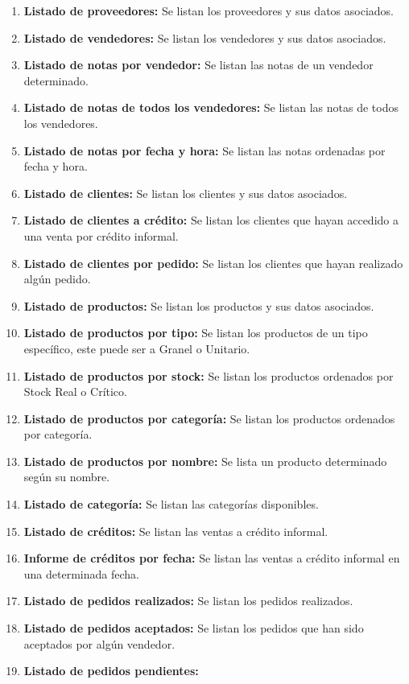 \documentclass[letterpaper,12pt]{article}
\begin{document}
\begin{enumerate}
\item \textbf{Listado de proveedores:} 
Se listan los proveedores y sus datos asociados.

\item \textbf{Listado de vendedores:} 
Se listan los vendedores y sus datos asociados.
\item \textbf{Listado de notas por vendedor:}
Se listan las notas de un vendedor determinado.
\item \textbf{Listado de notas de todos los vendedores:}
Se listan las notas de todos los vendedores.
\item \textbf{Listado de notas por fecha y hora:}
Se listan las notas ordenadas por fecha y hora.
\item \textbf{Listado de clientes:} 
Se listan los clientes y sus datos asociados.
\item \textbf{Listado de clientes a crédito:} 
Se listan los clientes que hayan accedido a una venta por crédito informal.
\item \textbf{Listado de clientes por pedido:} 
Se listan los clientes que hayan realizado algún pedido.
\item \textbf{Listado de productos:} 
Se listan los productos y sus datos asociados.
\item \textbf{Listado de productos por tipo:} 
Se listan los productos de un tipo específico, este puede ser a Granel o Unitario.
\item \textbf{Listado de productos por stock:} 
Se listan los productos ordenados por Stock Real o Crítico.
\item \textbf{Listado de productos por categoría:} 
Se listan los productos ordenados por categoría.
\item \textbf{Listado de productos por nombre:} 
Se lista un producto determinado según su nombre.
\item \textbf{Listado de categoría:} 
Se listan las categorías disponibles.
\item \textbf{Listado de créditos:} 
Se listan las ventas a crédito informal.
\item \textbf{Informe de créditos por fecha:} 
Se listan las ventas a crédito informal en una determinada fecha.
\item \textbf{Listado de pedidos realizados:} 
Se listan los pedidos realizados.
\item \textbf{Listado de pedidos aceptados:} 
Se listan los pedidos que han sido aceptados por algún vendedor.
\item \textbf{Listado de pedidos pendientes:} 

\end{enumerate}
\end{document}
